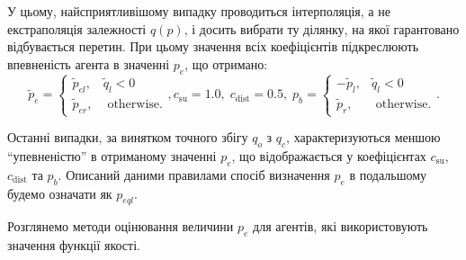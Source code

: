 \documentclass[a4paper,13pt]{atuaref}
\begin{document}
У цьому, найсприятливішому випадку проводиться інтерполяція, а не екстраполяція
залежності $ q(p)$, і досить вибрати ту ділянку, на якої гарантовано
відбувається перетин. При цьому значення всіх коефіцієнтів підкреслюють
впевненість агента в значенні $p_e$, що отримано:
%
\begin{equation}
  \tilde{p}_e
  =
  \begin{cases}
    \tilde{p}_{el}, & \tilde{q}_l < 0
    \\
    \tilde{p}_{er}, & \text{ otherwise}.
  \end{cases}
  ,
  c_\mathrm{su} = 1.0, \;  c_\mathrm{dist} = 0.5,  \;
  p_b =
  \begin{cases}
    -\tilde{p}_l, & \tilde{q}_l < 0
    \\
    \tilde{p}_r, & \text{ otherwise}.
  \end{cases}.
  \label{atu:eq:pr_e4}
\end{equation}

Останні випадки, за винятком точного збігу $q_o$ з $q_c$,
характеризуються меншою ``упевненістю'' в отриманому значенні $p_e$,
що відображається у коефіцієнтах
$c_\mathrm{su}$, $c_\mathrm{dist}$ та  $p_b$.
%
Описаний даними правилами спосіб визначення $p_e$ в подальшому будемо
означати як $p_{eql}$\label{atu:d:p_eql}.


Розглянемо методи оцінювання величини $p_e$ для агентів, які використовують значення функції якості.
\end{document}
